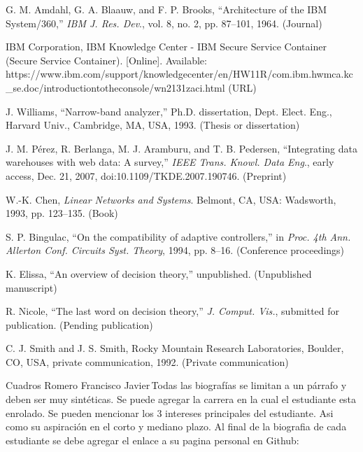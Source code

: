 \documentclass{IEEEcsmag}
\begin{document}
\begin{thebibliography}{1}

G. M. Amdahl, G. A. Blaauw, and F. P. Brooks, ``Architecture of the IBM System/360,'' {\it IBM J. Res. Dev}., vol. 8, no. 2, pp. 87--101, 1964. (Journal)

IBM Corporation, IBM Knowledge Center - IBM Secure Service Container (Secure Service Container). [Online]. Available: {https://www.ibm.com/support/\break knowledgecenter/en/HW11R/com.ibm.hwmca.kc\_se.doc/\break introductiontotheconsole/wn2131zaci.html} (URL)

J. Williams, ``Narrow-band analyzer,'' Ph.D. dissertation, Dept.  Elect. Eng., Harvard Univ., Cambridge, MA, USA, 1993. (Thesis or dissertation)

J. M. P\'erez, R. Berlanga, M. J. Aramburu, and T. B. Pedersen, ``Integrating data warehouses with web data: A survey,'' {\it IEEE Trans. Knowl. Data Eng}., early access, Dec. 21, 2007, doi:10.1109/TKDE.2007.190746. (Preprint)

W.-K. Chen, {\it Linear Networks and Systems}. Belmont, CA, USA: Wadsworth,  1993, pp. 123--135. (Book)

S. P. Bingulac, ``On the compatibility of adaptive controllers,'' in {\it Proc. 4th Ann. Allerton Conf. Circuits Syst. Theory}, 1994,  pp. 8--16. (Conference proceedings)

K. Elissa, ``An overview of decision theory,'' unpublished. (Unpublished manuscript)

R. Nicole, ``The last word on decision theory,'' {\it J. Comput. Vis.}, submitted for publication. (Pending publication)

C. J. Smith and J. S. Smith, Rocky Mountain Research Laboratories, Boulder, CO, USA, private communication, 1992. (Private communication)
\end{thebibliography}\vspace*{-8pt}


\begin{IEEEbiography}{Cuadros Romero Francisco Javier}{\,}Todas las biografías se limitan a un párrafo y deben ser muy sintéticas. Se puede agregar la carrera en la cual el estudiante esta enrolado. Se pueden mencionar los 3 intereses principales del estudiante. Asi como su aspiración en el corto y mediano plazo. Al final de la biografia de cada estudiante se debe agregar el enlace a su pagina personal en Github: 
\end{IEEEbiography}
\end{document}

